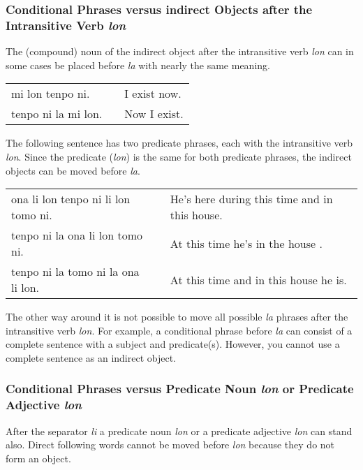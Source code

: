 \subsubsection*{Conditional Phrases versus indirect Objects after the Intransitive Verb \textit{lon} }
%
The (compound) noun of the indirect object after the intransitive verb \textit{lon} can in some cases be placed before \textit{la} with nearly the same meaning.

\begin{supertabular}{p{5,5cm}|ll}
    mi lon tenpo ni.    &  & I exist now. \\
    tenpo ni la mi lon. &  & Now I exist. \\
\end{supertabular}

The following sentence has two predicate phrases, each with the intransitive verb \textit{lon}.
Since the predicate (\textit{lon}) is the same for both predicate phrases, the indirect objects can be moved before \textit{la}.

\begin{supertabular}{p{5,5cm}|ll}
    ona li lon tenpo ni li lon tomo ni. &  & He's here during this time and in this house. \\
    tenpo ni la ona li lon tomo ni.     &  & At this time he's in the house .              \\
    tenpo ni la tomo ni la ona li lon.  &  & At this time and in this house he is.         \\
\end{supertabular}

The other way around it is not possible to move all possible \textit{la} phrases after the intransitive verb \textit{lon}.
For example, a conditional phrase before \textit{la} can consist of a complete sentence with a subject and predicate(s).
However, you cannot use a complete sentence as an indirect object.

%
%
\subsubsection*{Conditional Phrases versus Predicate Noun \textit{lon} or Predicate Adjective \textit{lon} }
%
%

After the separator \textit{li} a predicate noun \textit{lon} or a predicate adjective \textit{lon} can stand also.
Direct following words cannot be moved before \textit{lon} because they do not form an object.

